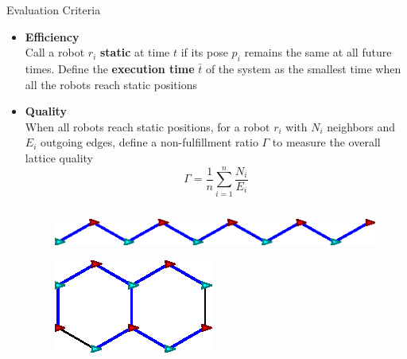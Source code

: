 \begin{frame}{Evaluation Criteria}
  \small{\begin{itemize}
  \item \textbf{Efficiency}\\
    Call a robot $r_i$ \textbf{static} at time $t$ if its pose $p_i$
    remains the same at all future times.
    Define the \textbf{execution time} $\bar{t}$ of the system as the
    smallest time when all the robots reach static positions
  \item \textbf{Quality} \\
    When all robots reach static positions, for a robot $r_i$ with
    $N_i$ neighbors and $E_i$ outgoing edges, define a non-fulfillment
    ratio $\Gamma$ to measure the overall lattice quality
    $$\Gamma = \dfrac{1}{n}\sum\limits_{i=1}^n \frac{N_i}{E_i}$$
  \end{itemize}
  }
  \begin{columns}[T] 
    \begin{column}{.4\textwidth}
        
    \end{column}%
    \begin{column}{.5\textwidth}
      \begin{figure}
        \centering
        \includegraphics[width=0.6\linewidth]{figs/bad-hexagon}
      \end{figure}
      \begin{figure}
        \centering
        \includegraphics[scale=0.65]{figs/good-hexagon}
      \end{figure}
    \end{column}%
  \end{columns}
\end{frame}